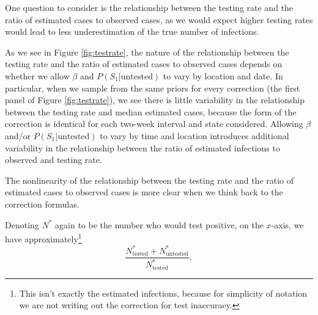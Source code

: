 \documentclass[12pt,twoside]{smiththesis}
\begin{document}
One question to consider is the relationship between the testing rate and the ratio of estimated cases to observed cases, as we would expect higher testing rates would lead to less underestimation of the true number of infections.

As we see in Figure \ref{fig:testrate}, the nature of the relationship between the testing rate and the ratio of estimated cases to observed cases depends on whether we allow \(\beta\) and \(P(S_1|\text{untested})\) to vary by location and date. In particular, when we sample from the same priors for every correction (the first panel of Figure \ref{fig:testrate}), we see there is little variability in the relationship between the testing rate and median estimated cases, because the form of the correction is identical for each two-week interval and state considered. Allowing \(\beta\) and/or \(P(S_1|\text{untested})\) to vary by time and location introduces additional variability in the relationship between the ratio of estimated infections to observed and testing rate.

The nonlinearity of the relationship between the testing rate and the ratio of estimated cases to observed cases is more clear when we think back to the correction formulas.

Denoting \(N^*\) again to be the number who would test positive, on the \(x\)-axis, we have approximately\footnote{This isn't exactly the estimated infections, because for simplicity of notation we are not writing out the correction for test inaccuracy.}
\[\frac{N^*_{\text{tested}} + N^*_{\text{untested}}}{N^*_{\text{tested}}},\]
\end{document}
